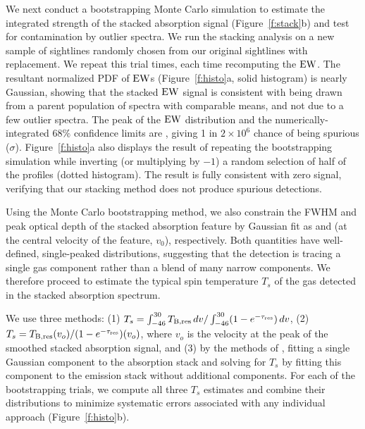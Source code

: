 \documentclass{aastex}
\begin{document}
We next conduct a bootstrapping \citep[see, e.g., ][]{Wall03}
Monte Carlo simulation to estimate the integrated strength of 
the stacked absorption signal (Figure~\ref{f:stack}b) and test 
for contamination by outlier spectra.  We run the stacking 
analysis on a new sample of \NoOfKeeps{} sightlines randomly 
chosen from our original \NoOfKeeps{} sightlines with 
replacement.  We repeat this trial \NoIterations{} times, 
each time recomputing the $\rm EW$.  The resultant normalized 
PDF of $\rm EW$s (Figure~\ref{f:histo}a, solid histogram) 
is nearly Gaussian, showing that the stacked $\rm EW$ 
signal is consistent with being drawn from a parent 
population of spectra with comparable means, and not 
due to a few outlier spectra. The peak of the $\rm EW$ 
distribution and the numerically-integrated $68\%$ 
confidence limits are \MonteCarloEW{}, giving 1 in 
$2\times10^6$ chance of being spurious (\StackedSNR{}$\sigma$).
Figure~\ref{f:histo}a also displays the result of repeating 
the bootstrapping simulation while inverting (or multiplying 
by $-1$) a random selection of half of the profiles (dotted 
histogram). The result is fully consistent with zero signal, 
verifying that our stacking method does not produce 
spurious detections.

Using the Monte Carlo bootstrapping method, we also 
constrain the FWHM and peak optical depth of the stacked 
absorption feature by Gaussian fit as \MCfwhm{} and \MCpeak{} (at the central
velocity of the feature, $v_0$), 
respectively. Both quantities have well-defined, 
single-peaked distributions, suggesting that the detection 
is tracing a single gas component rather than a blend of 
many narrow components.  We therefore proceed to estimate 
the typical spin temperature $T_s$ of the gas detected 
in the stacked absorption spectrum.

We use three methods: (1) 
$T_s = \int_{-46}^{30} T_{\rm B, res}\, dv /
\int_{-46}^{30} (1-e^{-\tau_{\rm res}})\,dv$, (2) 
$T_s = T_{\rm B, res}(v_o)/(1-e^{-\tau_{\rm res}})(v_o)$, 
where $v_o$ is the velocity at the peak of the smoothed 
stacked absorption signal, and (3) by the 
methods of \citet{HT031}, fitting a single Gaussian 
component to the absorption stack and solving for $T_s$ 
by fitting this component to the emission stack without additional
components. For each of the \NoIterations{} bootstrapping 
trials, we compute all three $T_s$ estimates and combine 
their distributions to minimize systematic errors 
associated with any individual approach 
(Figure~\ref{f:histo}b).
\end{document}
